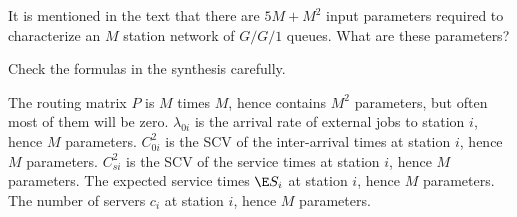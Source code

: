 \begin{exercise}
 It is mentioned in the text that there are $5M+M^2$ input parameters
 required to characterize an $M$ station network of $G/G/1$ queues. What are these parameters?
\begin{hint}
 Check the formulas in the synthesis carefully.
\end{hint}
\begin{solution}
 The routing matrix $P$ is $M$ times $M$, hence contains
 $M^2$ parameters, but often most of them will be zero.
 $\lambda_{0i}$ is the arrival rate of external jobs to station $i$, hence $M$ parameters.
 $C_{0i}^2$ is the SCV of the inter-arrival times at station
 $i$, hence $M$ parameters.
 $C_{si}^2$ is the SCV of the service times at station $i$,
 hence $M$ parameters.
 The expected service times $\E S_i$ at station $i$, 
 hence $M$ parameters.
 The number of servers $c_i$ at station $i$, hence $M$
 parameters.
\end{solution}
\end{exercise}


